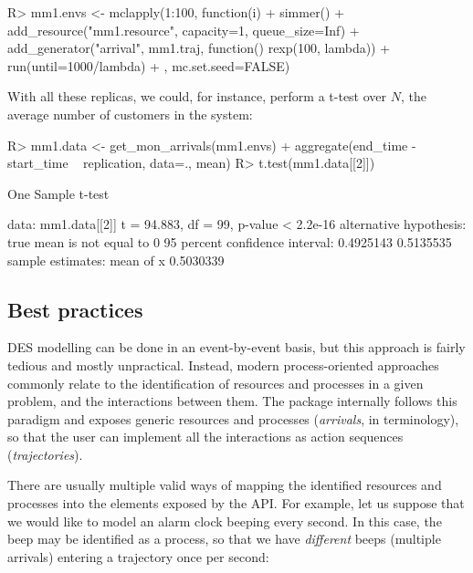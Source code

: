 \documentclass[
  nojss]{jss}
\begin{document}
\begin{CodeChunk}
\begin{CodeInput}
R> mm1.envs <- mclapply(1:100, function(i) {
+   simmer() %
+     add_resource("mm1.resource", capacity=1, queue_size=Inf) %
+     add_generator("arrival", mm1.traj, function() rexp(100, lambda)) %
+     run(until=1000/lambda) %
+ }, mc.set.seed=FALSE)
\end{CodeInput}
\end{CodeChunk}

With all these replicas, we could, for instance, perform a t-test over
\(N\), the average number of customers in the system:

\begin{CodeChunk}
\begin{CodeInput}
R> mm1.data <- get_mon_arrivals(mm1.envs) %
+   aggregate(end_time - start_time ~ replication, data=., mean)
R> t.test(mm1.data[[2]])
\end{CodeInput}
\begin{CodeOutput}

    One Sample t-test

data:  mm1.data[[2]]
t = 94.883, df = 99, p-value < 2.2e-16
alternative hypothesis: true mean is not equal to 0
95 percent confidence interval:
 0.4925143 0.5135535
sample estimates:
mean of x 
0.5030339 
\end{CodeOutput}
\end{CodeChunk}

\hypertarget{best-practices}{%
\subsection{Best practices}\label{best-practices}}

DES modelling can be done in an event-by-event basis, but this approach
is fairly tedious and mostly unpractical. Instead, modern
process-oriented approaches commonly relate to the identification of
resources and processes in a given problem, and the interactions between
them. The  package internally follows this paradigm and
exposes generic resources and processes (\emph{arrivals}, in
 terminology), so that the user can implement all the
interactions as action sequences (\emph{trajectories}).

There are usually multiple valid ways of mapping the identified
resources and processes into the elements exposed by the 
API. For example, let us suppose that we would like to model an alarm
clock beeping every second. In this case, the beep may be identified as
a process, so that we have \emph{different} beeps (multiple arrivals)
entering a  trajectory once per second:
\end{document}

